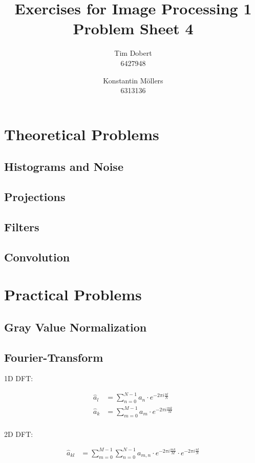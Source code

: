 \documentclass[a4paper,12pt]{article}
\title{\textbf{Exercises for Image Processing 1}\\Problem Sheet 4}
\author{Tim Dobert\\6427948 \and Konstantin M\"ollers\\6313136}
\begin{document}
	\maketitle	
	
	\section{Theoretical Problems}
	\subsection{Histograms and Noise}
	\subsection{Projections}
	\subsection{Filters}
	\subsection{Convolution}
	
	\section{Practical Problems}
	\subsection{Gray Value Normalization}
	\subsection{Fourier-Transform}
	
	1D DFT:
	
	\begin{align*}
		\hat{a}_l &= \sum\limits_{n = 0}^{N - 1} a_n \cdot e^{-2 \pi i \frac{nl}{N}} \\
		\hat{a}_k &= \sum\limits_{m = 0}^{M - 1} a_m \cdot e^{-2 \pi i \frac{mk}{M}} \\
	\end{align*}
	
	2D DFT:
	
	\begin{align*}
	\hat{a}_{kl} &= \sum\limits_{m = 0}^{M - 1} \sum\limits_{n = 0}^{N - 1} a_{m, n} \cdot e^{-2 \pi i \frac{mk}{M}} \cdot e^{-2 \pi i \frac{nl}{N}} \\
	\end{align*}
\end{document}
